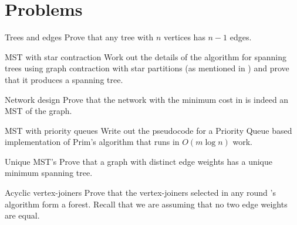 \newpage
\section{Problems}

\begin{probl}{Trees and edges}
Prove that any tree with $n$ vertices has $n-1$ edges. 
\end{probl}

\begin{probl}{MST with star contraction}
Work out the details of the algorithm for spanning trees using graph
contraction with star partitions (as mentioned in )
and prove that it produces a spanning tree.
\end{probl}

\begin{probl}{Network design}
Prove that the network with the minimum cost in
 is indeed an MST of the graph.
\end{probl}

\begin{probl}{MST with priority queues}
Write out the pseudocode for a Priority Queue based implementation
of Prim's algorithm that runs in $O(m \log n)$ work.
\end{probl}



\begin{probl}{Unique MST's}
Prove that a graph with distinct edge weights has a unique minimum
spanning tree.
\end{probl}


\begin{probl}{Acyclic vertex-joiners}
  Prove that the vertex-joiners selected in any round \boruvka's
  algorithm form a forest.  Recall that we are assuming that no two
  edge weights are equal.
\end{probl}
